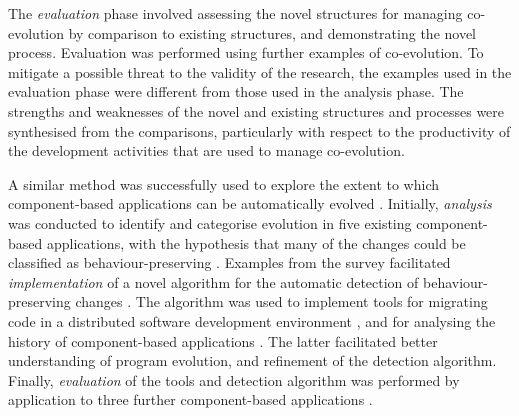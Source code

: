 The \emph{evaluation} phase involved assessing the novel structures for managing co-evolution by comparison to existing structures, and demonstrating the novel process. Evaluation was performed using further examples of co-evolution. To mitigate a possible threat to the validity of the research, the examples used in the evaluation phase were different from those used in the analysis phase. The strengths and weaknesses of the novel and existing structures and processes were synthesised from the comparisons, particularly with respect to the productivity of the development activities that are used to manage co-evolution.

A \cc similar method was successfully used to explore the extent to which component-based applications can be automatically evolved \cite{dig07thesis}. Initially, \cc \emph{analysis} was conducted to identify and categorise evolution in five existing component-based applications, with the hypothesis that many of the changes could be classified as behaviour-preserving \cite{dig06apis}. Examples \cc from the survey facilitated \emph{implementation} of a novel algorithm for the automatic detection of behaviour-preserving changes \cite{dig06detection}. The algorithm was used to implement tools for migrating code in a distributed software development environment \cite{dig06automatic}, and for analysing the history of component-based applications \cite{dig07cms}. The latter facilitated better understanding of program evolution, and refinement of the detection algorithm. Finally, \cc \emph{evaluation} of the tools and detection algorithm was performed by application to three further component-based applications \cite{dig07thesis}.